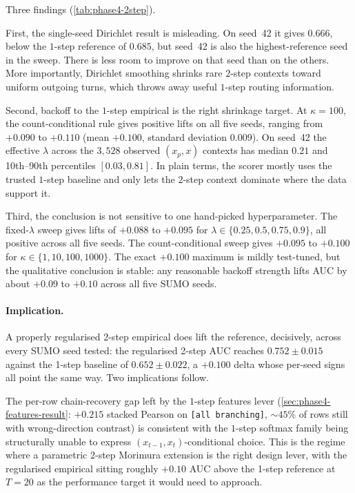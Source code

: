 Three findings (\cref{tab:phase4-2step}).

First, the single-seed Dirichlet result is misleading. On seed~42 it gives
$0.666$, below the $1$-step reference of $0.685$, but seed~42 is also the
highest-reference seed in the sweep. There is less room to improve on
that seed than on the others. More importantly, Dirichlet smoothing
shrinks rare $2$-step contexts toward uniform outgoing turns, which throws
away useful $1$-step routing information.

Second, backoff to the $1$-step empirical is the right shrinkage target.
At $\kappa = 100$, the count-conditional rule gives positive lifts on all
five seeds, ranging from $+0.090$ to $+0.110$ (mean $+0.100$, standard
deviation $0.009$). On seed~42 the effective $\lambda$ across the
$3{,}528$ observed $(x_p,x)$ contexts has median $0.21$ and 10th--90th
percentiles $[0.03,0.81]$. In plain terms, the scorer mostly uses the
trusted $1$-step baseline and only lets the $2$-step context dominate
where the data support it.

Third, the conclusion is not sensitive to one hand-picked hyperparameter.
The fixed-$\lambda$ sweep gives lifts of
$+0.088$ to $+0.095$ for $\lambda \in \{0.25,0.5,0.75,0.9\}$, all
positive across all five seeds. The count-conditional sweep gives
$+0.095$ to $+0.100$ for $\kappa \in \{1,10,100,1000\}$. The exact
$+0.100$ maximum is mildly test-tuned, but the qualitative conclusion is
stable: any reasonable backoff strength lifts AUC by about $+0.09$ to
$+0.10$ across all five SUMO seeds.

\paragraph{Implication.} A properly regularised 2-step empirical
does lift the reference, decisively, across every SUMO seed
tested: the regularised 2-step AUC reaches $0.752 \pm 0.015$ against
the 1-step baseline of $0.652 \pm 0.022$, a $+0.100$ delta whose
per-seed signs all point the same way. Two implications follow.

The per-row chain-recovery gap left by the $1$-step features lever
(\cref{sec:phase4-features-result}: $+0.215$ stacked Pearson on
\texttt{[all branching]}, $\sim 45\%$ of rows still with
wrong-direction contrast) is consistent with the $1$-step softmax
family being structurally unable to express $(x_{t-1}, x_t)$-conditional
choice. This is the regime where a parametric 2-step Morimura
extension is the right design lever, with the regularised empirical
sitting roughly $+0.10$ AUC above the 1-step reference at $T = 20$ as the
performance target it would need to approach.

